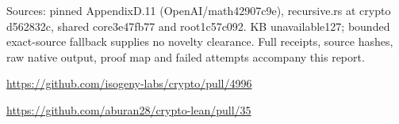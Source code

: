 \documentclass[10pt]{article}
\begin{document}
\small Sources: pinned AppendixD.11 (OpenAI/math42907c9e), recursive.rs at
crypto d562832c, shared core3e47fb77 and root1c57c092. KB unavailable127;
bounded exact-source fallback supplies no novelty clearance. Full receipts,
source hashes, raw native output, proof map and failed attempts accompany this report.\par
\url{https://github.com/isogeny-labs/crypto/pull/4996}\par
\url{https://github.com/aburan28/crypto-lean/pull/35}
\end{document}
